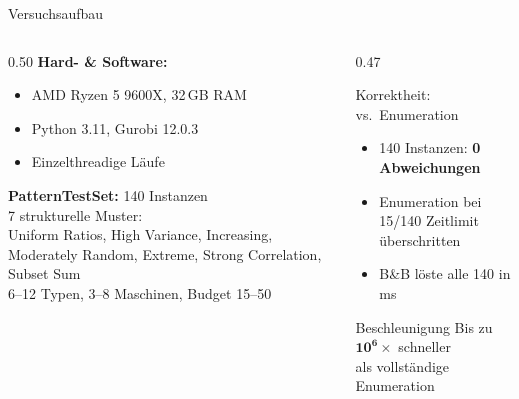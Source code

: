 \documentclass[fleqn,11pt,aspectratio=43]{beamer}
\begin{document}
\begin{frame}[shrink=5]{Versuchsaufbau}
  \begin{columns}[T]
    \begin{column}{0.50\textwidth}
      \textbf{Hard- \& Software:}
      \begin{itemize}
        \item AMD Ryzen 5 9600X, 32\,GB RAM
        \item Python 3.11, Gurobi 12.0.3
        \item Einzelthreadige Läufe
      \end{itemize}
      \textbf{PatternTestSet:} 140 Instanzen\\
      7 strukturelle Muster:\\
      \footnotesize Uniform Ratios, High Variance, Increasing, Moderately Random,
      Extreme, Strong Correlation, Subset Sum\\
      \normalsize 6--12 Typen, 3--8 Maschinen, Budget 15--50
    \end{column}
    \begin{column}{0.47\textwidth}
      \begin{block}{Korrektheit: vs.\ Enumeration}
        \begin{itemize}
          \item 140 Instanzen: \textbf{0 Abweichungen}
          \item Enumeration bei 15/140 Zeitlimit überschritten
          \item B\&B löste alle 140 in ms
        \end{itemize}
      \end{block}
      \begin{alertblock}{Beschleunigung}
        Bis zu $\mathbf{10^6\times}$ schneller\\als vollständige Enumeration
      \end{alertblock}
    \end{column}
  \end{columns}
\end{frame}
\end{document}
